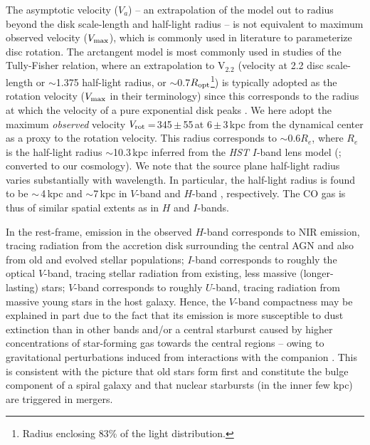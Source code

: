 \documentclass[]{emulateapj}
\begin{document}
The asymptotic velocity ($V_{a}$) -- an extrapolation of the model
out to radius beyond the disk scale-length and half-light radius --
is not equivalent to maximum observed velocity ($V_{\rm max}$),
which is commonly used in literature to parameterize disc rotation.
The arctangent model is most commonly used in studies of the
Tully-Fisher relation, where an extrapolation to V$_{2.2}$ (velocity
at 2.2 disc scale-length or $\sim$1.375 half-light radius,
or $\sim$0.7$R_{\rm opt}$\footnote{Radius enclosing 83\% of the light
distribution.}) is typically adopted
as the rotation velocity ($V_{\rm max}$ in their
terminology) since this corresponds to the radius at which the velocity
of a pure exponential disk peaks \citep{Courteau97b}.
We here adopt the maximum {\em observed} velocity
$V_{\rm rot}$\,=\,345\,$\pm$\,55\,\kms at 6\,$\pm$\,3\,kpc from the %
dynamical center as a proxy to the rotation velocity.
This radius corresponds to $\sim$0.6$R_e$, where $R_e$ is the half-light
radius $\sim$10.3\,kpc inferred from the {\it HST} $I$-band
lens model (; converted to
our cosmology).
We note that the source plane half-light radius varies substantially with
wavelength. In particular, the half-light radius is found to be
$\sim$\,4\,kpc and $\sim$7\,kpc in $V$-band
 and $H$-band , respectively.
The CO gas is thus of similar spatial
extents as in $H$ and $I$-bands.

In the rest-frame,
emission in the observed $H$-band corresponds to NIR emission,
tracing radiation from the accretion disk surrounding
the central AGN and also from old and evolved stellar populations;
$I$-band corresponds to roughly the optical $V$-band, tracing stellar radiation from
existing, less massive (\ie longer-lasting) stars;
$V$-band corresponds to roughly $U$-band,  tracing radiation from massive young stars
in the host galaxy. Hence,
the $V$-band compactness may be explained in part
due to the fact that its emission is
more susceptible to dust extinction than in other bands and/or
a central starburst caused by higher
concentrations of star-forming gas towards the central regions -- owing to
gravitational perturbations induced
from interactions with the companion
\citep[\eg][]{DiMatteo05a}.
This is consistent with the picture that old stars form first and constitute the bulge component
of a spiral galaxy and that nuclear starbursts (in the inner few kpc) are triggered in mergers.
\end{document}
